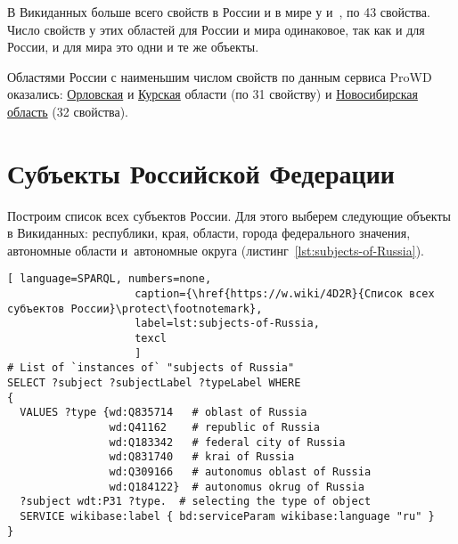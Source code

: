 В Викиданных больше всего свойств в России и в мире у  
и~, по 43 свойства\autocite{Russia_prowd}. 
Число свойств у этих областей для России и мира одинаковое, так как и для России, и для мира это одни и те же объекты.

Областями России с наименьшим числом свойств по данным сервиса ProWD оказались: 
\href{http://www.wikidata.org/entity/Q3129}{Орловская} и \href{http://www.wikidata.org/entity/Q3178}{Курская} области (по 31 свойству) и \href{http://www.wikidata.org/entity/Q5851}{Новосибирская область} (32 свойства).




\section{Субъекты Российской Федерации}

Построим список всех субъектов России. 
Для этого выберем следующие объекты в Викиданных: 
республики, края, области, города федерального значения, автономные области и~автономные округа (листинг~\ref{lst:subjects-of-Russia}).


\begin{lstlisting}[ language=SPARQL, numbers=none,
                    caption={\href{https://w.wiki/4D2R}{Список всех субъектов России}\protect\footnotemark},
                    label=lst:subjects-of-Russia,
                    texcl 
                    ]
# List of `instances of` "subjects of Russia" 
SELECT ?subject ?subjectLabel ?typeLabel WHERE
{  
  VALUES ?type {wd:Q835714   # oblast of Russia
                wd:Q41162    # republic of Russia
                wd:Q183342   # federal city of Russia
                wd:Q831740   # krai of Russia
                wd:Q309166   # autonomus oblast of Russia
                wd:Q184122}  # autonomus okrug of Russia
  ?subject wdt:P31 ?type.  # selecting the type of object
  SERVICE wikibase:label { bd:serviceParam wikibase:language "ru" }
}
\end{lstlisting}%

